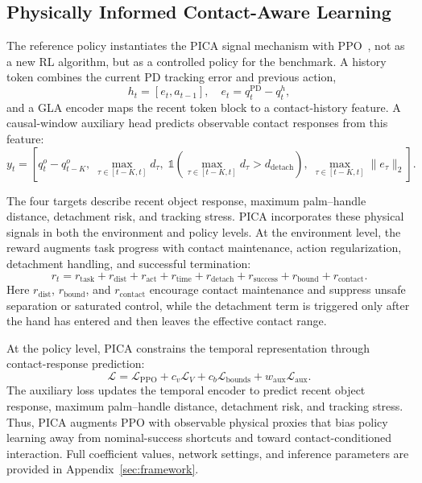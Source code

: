 \documentclass{llmxive}
\begin{document}
\subsection{Physically Informed Contact-Aware Learning}
\label{sec:pica}

The reference policy instantiates the PICA signal mechanism with PPO~\cite{schulman2017proximal},
not as a new RL algorithm, but as a controlled policy for the
benchmark. A history token combines the current PD tracking error
and previous action,
\begin{equation}
h_t=[e_t,a_{t-1}],\quad e_t=q_t^{\mathrm{PD}}-q_t^h,
\label{eq:token_main}
\end{equation}
and a GLA encoder\cite{yang2024gated} maps the recent token block to a contact-history
feature. A causal-window auxiliary head predicts observable contact
responses from this feature:
\begin{equation}
y_t = \left[
q_t^o-q_{t-K}^o,\;
\max_{\tau\in[t-K,t]}d_\tau,\;
\mathbb{1}\!\left(\max_{\tau\in[t-K,t]}d_\tau>d_{\mathrm{detach}}\right),\;
\max_{\tau\in[t-K,t]}\lVert e_\tau\rVert_2
\right].
\label{eq:aux_main}
\end{equation}




The four targets describe recent object response, maximum
palm--handle distance, detachment risk, and tracking stress. PICA
incorporates these physical signals in both the environment and policy
levels. At the environment level, the reward augments task progress
with contact maintenance, action regularization, detachment handling,
and successful termination:
\begin{equation}
r_t =
r_{\mathrm{task}}
+ r_{\mathrm{dist}}
+ r_{\mathrm{act}}
+ r_{\mathrm{time}}
+ r_{\mathrm{detach}}
+ r_{\mathrm{success}}
+ r_{\mathrm{bound}}
+ r_{\mathrm{contact}} .
\label{eq:pica_reward_main}
\end{equation}
Here $r_{\mathrm{dist}}$, $r_{\mathrm{bound}}$, and
$r_{\mathrm{contact}}$ encourage contact maintenance and suppress
unsafe separation or saturated control, while the detachment term is
triggered only after the hand has entered and then leaves the effective
contact range.

At the policy level, PICA constrains the temporal representation
through contact-response prediction:
\begin{equation}
\mathcal{L} =
\mathcal{L}_{\mathrm{PPO}}
+ c_v \mathcal{L}_V
+ c_b \mathcal{L}_{\mathrm{bounds}}
+ w_{\mathrm{aux}} \mathcal{L}_{\mathrm{aux}} .
\label{eq:pica_objective_main}
\end{equation}
The auxiliary loss updates the temporal encoder to predict recent
object response, maximum palm--handle distance, detachment risk, and
tracking stress. Thus, PICA augments PPO with observable physical
proxies that bias policy learning away from nominal-success shortcuts
and toward contact-conditioned interaction. Full coefficient values,
network settings, and inference parameters are provided in
Appendix~\ref{sec:framework}.
\end{document}
